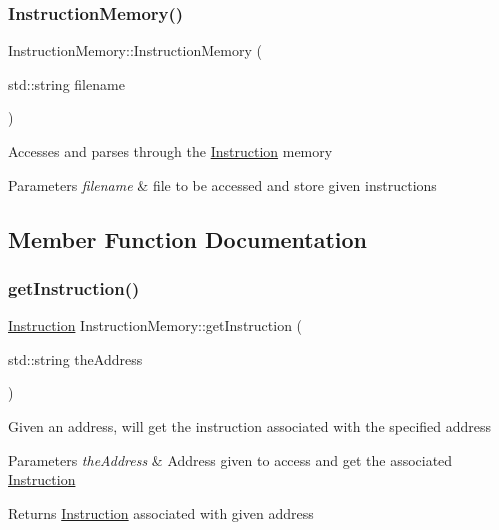 \subsubsection{\texorpdfstring{Instruction\+Memory()}{InstructionMemory()}}
{\footnotesize\ttfamily Instruction\+Memory\+::\+Instruction\+Memory (\begin{DoxyParamCaption}\item[{std\+::string}]{filename }\end{DoxyParamCaption})}

Accesses and parses through the \mbox{\hyperlink{class_instruction}{Instruction}} memory 
\begin{DoxyParams}{Parameters}
{\em filename} & file to be accessed and store given instructions \\
\hline
\end{DoxyParams}


\subsection{Member Function Documentation}
\mbox{\label{class_instruction_memory_a9991daa81af7611a8ff76bbbd4b64630}} 
\subsubsection{\texorpdfstring{get\+Instruction()}{getInstruction()}}
{\footnotesize\ttfamily \mbox{\hyperlink{class_instruction}{Instruction}} Instruction\+Memory\+::get\+Instruction (\begin{DoxyParamCaption}\item[{std\+::string}]{the\+Address }\end{DoxyParamCaption})}

Given an address, will get the instruction associated with the specified address 
\begin{DoxyParams}{Parameters}
{\em the\+Address} & Address given to access and get the associated \mbox{\hyperlink{class_instruction}{Instruction}} \\
\hline
\end{DoxyParams}
\begin{DoxyReturn}{Returns}
\mbox{\hyperlink{class_instruction}{Instruction}} associated with given address 
\end{DoxyReturn}
\mbox{\label{class_instruction_memory_a530d8236c9ddb2827d13a17bb5a6cdd6}} 
